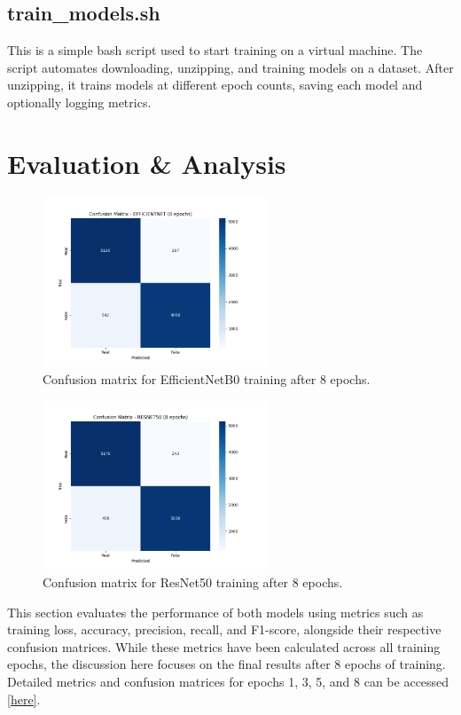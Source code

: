 \documentclass[conference]{IEEEtran}
\begin{document}
    \subsection*{train\_models.sh}
    This is a simple bash script used to start training on a virtual machine. The script automates downloading, unzipping, and training models on a dataset. After unzipping, it trains models at different epoch counts, saving each model and optionally logging metrics.


\section{Evaluation \& Analysis}
\begin{figure}[ht]
\centering
\includegraphics[width=0.6\textwidth]{ef8.png}
\caption{Confusion matrix for EfficientNetB0 training after 8 epochs.}
\label{ef8}
\end{figure} 

\begin{figure}[ht]
\centering
\includegraphics[width=0.6\textwidth]{re8.png}
\caption{Confusion matrix for ResNet50 training after 8 epochs.}
\label{re8}
\end{figure}

This section evaluates the performance of both models using metrics such as training loss, accuracy, precision, recall, and F1-score, alongside their respective confusion matrices. While these metrics have been calculated across all training epochs, the discussion here focuses on the final results after 8 epochs of training. Detailed metrics and confusion matrices for epochs 1, 3, 5, and 8 can be accessed \href{https://github.com/konradwojda/HYU-AI-G08/tree/main/results}{[here]}.  
\end{document}
